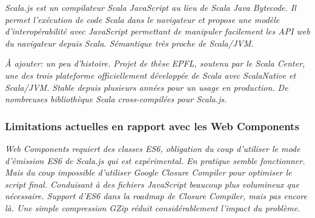 \textit{Scala.js est un compilateur Scala \to JavaScript au lieu de Scala \to Java Bytecode. Il permet l'exécution de code Scala dans le navigateur et propose une modèle d'interopérabilité avec JavaScript permettant de manipuler facilement les API web du navigateur depuis Scala. Sémantique très proche de Scala/JVM.}

\textit{À ajouter: un peu d'histoire. Projet de thèse EPFL, soutenu par le Scala Center, une des trois plateforme officiellement développée de Scala avec ScalaNative et Scala/JVM. Stable depuis plusieurs années pour un usage en production. De nombreuses bibliothèque Scala cross-compilées pour Scala.js.}

\subsubsection{Limitations actuelles en rapport avec les Web Components}

\textit{Web Components requiert des classes ES6, obligation du coup d'utiliser le mode d'émission ES6 de Scala.js qui est expérimental. En pratique semble fonctionner. Mais du coup impossible d'utiliser Google Closure Compiler pour optimiser le script final. Conduisant à des fichiers JavaScript beaucoup plus volumineux que nécessaire. Support d'ES6 dans la roadmap de Closure Compiler, mais pas encore là. Une simple compression GZip réduit considérablement l'impact du problème.}